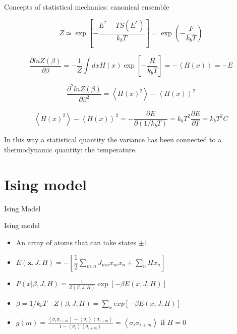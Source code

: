 \documentclass{beamer}
\begin{document}
\begin{frame}{Concepts of statistical mechanics: canonical ensemble\cite{peliti2011statistical} }

\begin{equation}
Z\simeq \exp\left[-\dfrac{E^{*}-TS(E^{*})}{k_{b}T} \right]=\exp\left( - \frac{F}{k_{b}T}  \right)     
\end{equation}

\begin{equation}
\dfrac{\partial ln Z(\beta)}{\partial \beta}=-\dfrac{1}{Z}\int dx H(x)\exp\left[  -\dfrac{H}{k_{b}T}\right]=-\left\langle H(x) \right\rangle=-E
\end{equation}

\begin{equation}
\dfrac{\partial^{2} ln Z(\beta)}{\partial \beta^{2}}=\left\langle H(x)^{2} \right\rangle-\left\langle H(x) \right\rangle^{2}
\end{equation}

\begin{equation}
\left\langle H(x)^{2} \right\rangle-\left\langle H(x) \right\rangle^{2}=-\dfrac{\partial E}{\partial (1/k_{b}T)}=k_{b}T^{2}\dfrac{\partial E}{\partial T}=k_{b}T^{2}C
\end{equation}

In this way a statistical quantity the variance has been connected to a thermodynamic quantity: the temperature.

\end{frame}

\section{Ising model}

\begin{frame}{}
\begin{center}
{\Huge Ising Model}
\end{center}
\end{frame}


\begin{frame}{Ising model \cite{mackay2003information,slides}}
\begin{itemize}
\item An array of atoms that can take states $\pm 1$
\item $E(\textbf{x},J,H)= - \left[\dfrac{1}{2}\sum_{m,n}J_{mn}x_{m}x_{n}+\sum_{n}Hx_{n} \right]$
\item $P(x|\beta,J,H)=\frac{1}{Z(\beta,J,H)}\exp[-\beta E(x,J,H)]$
\item $\beta=1/k_{b}T\quad Z(\beta,J,H)=\sum_{x}exp\left[-\beta E(x,J,H)\right]$
\item $g(m)=\frac{\left\langle \sigma_{i}\sigma_{i+m}  \right\rangle - \left\langle \sigma_{i} \right\rangle \left\langle \sigma_{i+m} \right\rangle  }{1- \left\langle \sigma_{i} \right\rangle \left\langle \sigma_{i+m} \right\rangle }=\left\langle \sigma_{i}\sigma_{i+m}  \right\rangle $ if $H=0$
\end{itemize}
\end{frame}
\end{document}

